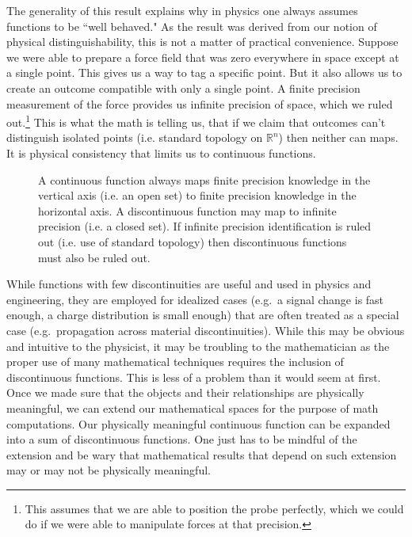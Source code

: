\documentclass[smallextended]{svjour3}
\numberwithin{equation}{section}
\theoremstyle{definition}
\begin{document}
The generality of this result explains why in physics one always assumes functions to be ``well behaved." As the result was derived from our notion of physical distinguishability, this is not a matter of practical convenience. Suppose we were able to prepare a force field that was zero everywhere in space except at a single point. This gives us a way to tag a specific point. But it also allows us to create an outcome compatible with only a single point. A finite precision measurement of the force provides us infinite precision of space, which we ruled out.\footnote{This assumes that we are able to position the probe perfectly, which we could do if we were able to manipulate forces at that precision.} This is what the math is telling us, that if we claim that outcomes can't distinguish isolated points (i.e. standard topology on $\mathbb{R}^n$) then neither can maps. It is physical consistency that limits us to continuous functions.

\begin{figure}
	
	\caption{A continuous function always maps finite precision knowledge in the vertical axis (i.e. an open set) to finite precision knowledge in the horizontal axis. A discontinuous function may map to infinite precision (i.e. a closed set). If infinite precision identification is ruled out (i.e. use of standard topology) then discontinuous functions must also be ruled out.}
	\label{fig:continuity}
\end{figure}

While functions with few discontinuities are useful and used in physics and engineering, they are employed for idealized cases  (e.g.~a signal change is fast enough, a charge distribution is small enough) that are often treated as a special case (e.g.~propagation across material discontinuities). While this may be obvious and intuitive to the physicist, it may be troubling to the mathematician as the proper use of many mathematical techniques requires the inclusion of discontinuous functions. This is less of a problem than it would seem at first. Once we made sure that the objects and their relationships are physically meaningful, we can extend our mathematical spaces for the purpose of math computations. Our physically meaningful continuous function can be expanded into a sum of discontinuous functions. One just has to be mindful of the extension and be wary that mathematical results that depend on such extension may or may not be physically meaningful.
\end{document}
